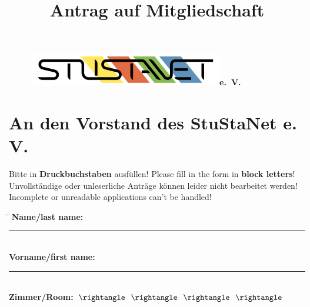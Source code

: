\documentclass[a4paper,10pt]{scrartcl}
\title{Antrag auf Mitgliedschaft}
\date{}
\begin{document}

\maketitle
\vspace{-65pt}

\begin{figure}[t!]
   \centering
   \vspace{-40pt}
   \mbox{\includegraphics[width=0.75\textwidth,keepaspectratio]{StuStaNet_Logo}\Huge \sffamily \textbf{e. V.}}
   \vspace{-40pt}
\end{figure}


\section*{An den Vorstand des StuStaNet e. V.}






	\Large Bitte in \textbf{Druckbuchstaben} ausfüllen! Please fill in the form in \textbf{block letters}!\\
\large Unvollständige oder unleserliche Anträge können leider nicht bearbeitet werden!\\
Incomplete or unreadable applications can't be handled!


\vfill

{\Large
\begin{tabbing}
	\hspace{11em}\=\kill
	\bfseries Name/last name: \> \rule{12cm}{0.4pt}
	\\[1.3em]
	\bfseries Vorname/first name: \> \rule{12cm}{0.4pt} 
	\\[1.3em]
        \bfseries Zimmer/Room: \>
	{\underline {\TextField[name=zimmer, bordercolor=white, width=2.4em, maxlen=4, borderwidth=0]{}}}
	{\color{gray} $\rightangle \hspace{.7em} \rightangle \hspace{.7em} \rightangle \hspace{.7em} \rightangle$} \\
\end{tabbing}
}
\vspace{-10pt}
\end{document}
